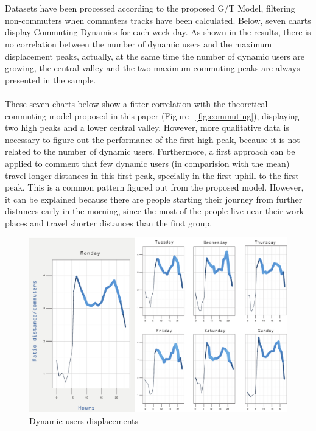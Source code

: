 \\
\\
Datasets have been processed according to the proposed G/T Model, filtering non-commuters when commuters tracks have been calculated. Below, seven charts display Commuting Dynamics for each week-day.
As shown in the results, there is no correlation between the number of dynamic users and the maximum displacement peaks, actually, at the same time the number of dynamic users are growing, the central valley and the two maximum commuting peaks are always presented in the sample.
\\
\\
These seven charts below show a fitter correlation with the theoretical commuting model proposed in this paper (Figure ~\ref{fig:commuting}), displaying two high peaks and a lower central valley. However, more qualitative data is necessary to figure out the performance of the first high peak, because it is not related to the number of dynamic users. Furthermore, a first approach can be applied to comment that few dynamic users (in comparision with the mean) travel longer distances in this first peak, specially in  the first uphill to the first peak. This is a common pattern figured out from the proposed model. However, it can be explained because there are people starting their journey from further distances early in the morning, since the most of the people live near their work places and travel shorter distances than the first group.


\begin{figure}[h]
\begin{center}
\includegraphics[scale = 0.75] {results/images/commuting_results.pdf}
\caption{Dynamic users displacements}
\label{fig:dynamic_displacements}
\end{center}
\end{figure}

